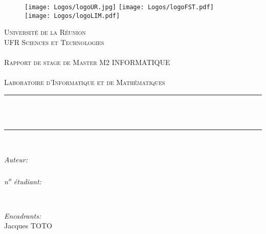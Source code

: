 \newcommand{\HRule}{\rule{\linewidth}{0.5mm}} %


\begin{titlepage}
	
	\begin{figure}[htbp!]
		\begin{center}
			\texttt{[image: Logos/logoUR.jpg]}\hspace{2cm}
			\texttt{[image: Logos/logoFST.pdf]}\hspace{2cm}  
			\texttt{[image: Logos/logoLIM.pdf]}%
		\end{center}
	\end{figure}

	\center %
	\textsc{\LARGE Université de la Réunion}\\[1.4cm]%
	\textsc{\Large UFR Sciences et Technologies}\\%
		\textsc{\Large ~}\\
	\textsc{\Large Rapport de stage de Master M2 INFORMATIQUE}\\%
	\textsc{\Large ~}\\
	\textsc{\Large Laboratoire d'Informatique et de Mathématiques}\\[1.4cm]%
	\HRule \\[0.4cm]
	{ \huge \bfseries \sffamily\mdseries\upshape \titre }\\[0.4cm] %
	\HRule \\[2cm]
	\begin{minipage}{0.4\textwidth}
		\begin{flushleft} \large
			\emph{Auteur:}\\
			\auteur \\    %
			\emph{n\textsuperscript{o} étudiant: \numetu} %
		\end{flushleft}
	\end{minipage}
	~
	\begin{minipage}{0.4\textwidth} %
		\begin{flushright} \large
			\emph{Encadrants:} \\
			Jacques  \textsc{TOTO}\\ %
		\end{flushright}
	\end{minipage}\\[1.7cm]


\end{titlepage}
